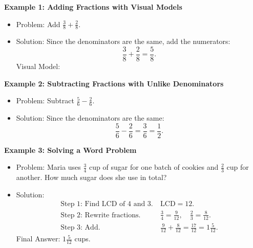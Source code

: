 \documentclass[12pt]{article}
\begin{document}
\begin{tcolorbox}[colframe=black!60, colback=white, 
coltitle=black, colbacktitle=black!15, fonttitle=\bfseries\Large, 
title=Examples, halign title=center, left=10pt, right=10pt, top=10pt, bottom=15pt]
\textbf{Example 1: Adding Fractions with Visual Models}
\begin{itemize}
    \item Problem: Add \( \frac{3}{8} + \frac{2}{8} \).
    \item Solution: Since the denominators are the same, add the numerators:
    \[
    \frac{3}{8} + \frac{2}{8} = \frac{5}{8}.
    \]
    Visual Model:
    \begin{center}
    \end{center}
\end{itemize}

\textbf{Example 2: Subtracting Fractions with Unlike Denominators}
\begin{itemize}
    \item Problem: Subtract \( \frac{5}{6} - \frac{2}{6} \).
    \item Solution: Since the denominators are the same:
    \[
    \frac{5}{6} - \frac{2}{6} = \frac{3}{6} = \frac{1}{2}.
    \]
\end{itemize}

\textbf{Example 3: Solving a Word Problem}
\begin{itemize}
    \item Problem: Maria uses \( \frac{3}{4} \) cup of sugar for one batch of cookies and \( \frac{2}{3} \) cup for another. How much sugar does she use in total?
    \item Solution:
    \begin{align*}
        \text{Step 1: Find LCD of 4 and 3.} &\ \text{LCD} = 12. \\
        \text{Step 2: Rewrite fractions.} &\ \frac{3}{4} = \frac{9}{12}, \quad \frac{2}{3} = \frac{8}{12}. \\
        \text{Step 3: Add.} &\ \frac{9}{12} + \frac{8}{12} = \frac{17}{12} = 1 \frac{5}{12}.
    \end{align*}
    Final Answer: \( 1 \frac{5}{12} \) cups.
\end{itemize}
\end{tcolorbox}
\end{document}
